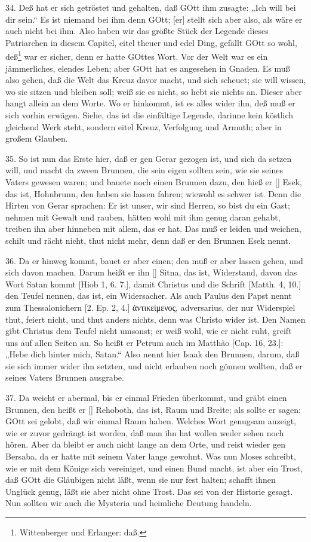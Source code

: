 34. Deß hat er sich getröstet und gehalten, daß GOtt ihm zusagte: „Ich will bei dir sein.“ Es ist niemand bei ihm denn GOtt; [er] stellt sich aber also, als wäre er auch nicht bei ihm. Also haben wir das größte Stück der Legende dieses Patriarchen in diesem Capitel, eitel theuer und edel Ding, gefällt GOtt so wohl, deß\footnote{Wittenberger und Erlanger: daß.} war er sicher, denn er hatte GOttes Wort. Vor der Welt war es ein jämmerliches, elendes Leben; aber GOtt hat es angesehen in Gnaden. Es muß also gehen, daß die Welt das Kreuz davor macht, und sich scheuet; sie will wissen, wo sie sitzen und bleiben soll; weiß sie es nicht, so hebt sie nichts an. Dieser aber hangt allein an dem Worte. Wo er hinkommt, ist es alles wider ihn, deß muß er sich vorhin erwägen. Siehe, das ist die einfältige Legende, darinne kein köstlich gleichend Werk steht, sondern eitel Kreuz, Verfolgung und Armuth; aber in großem Glauben.

35. So ist nun das Erste hier, daß er gen Gerar gezogen ist, und sich da setzen will, und macht da zween Brunnen, die sein eigen sollten sein, wie sie seines Vaters gewesen waren; und bauete noch einen Brunnen dazu, den hieß er [] Esek, das ist, Hohnbrunn, den haben sie lassen fahren; wiewohl es schwer ist. Denn die Hirten von Gerar sprachen: Er ist unser, wir sind Herren, so bist du ein Gast; nehmen mit Gewalt und rauben, hätten wohl mit ihm genug daran gehabt, treiben ihn aber hinneben mit allem, das er hat. Das muß er leiden und weichen, schilt und rächt nicht, thut nicht mehr, denn daß er den Brunnen Esek nennt.

36. Da er hinweg kommt, bauet er aber einen; den muß er aber lassen gehen, und sich davon machen. Darum heißt er ihn [] Sitna, das ist, Widerstand, davon das Wort Satan kommt [Hiob 1, 6. 7.], damit Christus und die Schrift [Matth. 4, 10.] den Teufel nennen, das ist, ein Widersacher. Als auch Paulus den Papst nennt zum Thessalonichern [2. Ep. 2, 4.] ἀντικείμενος, adversarius, der nur Widerspiel thut, feiert nicht, und thut anders nichts, denn was Christo wider ist. Den Namen gibt Christus dem Teufel nicht umsonst; er weiß wohl, wie er nicht ruht, greift uns auf allen Seiten an. So heißt er Petrum auch im Matthäo [Cap. 16, 23.]: „Hebe dich hinter mich, Satan.“ Also nennt hier Isaak den Brunnen, darum, daß sie sich immer wider ihn setzten, und nicht erlauben noch gönnen wollten, daß er seines Vaters Brunnen ausgrabe.

37. Da weicht er abermal, bis er einmal Frieden überkommt, und gräbt einen Brunnen, den heißt er [] Rehoboth, das ist, Raum und Breite; als sollte er sagen: GOtt sei gelobt, daß wir einmal Raum haben. Welches Wort genugsam anzeigt, wie er zuvor gedrängt ist worden, daß man ihn hat wollen weder sehen noch hören. Aber da bleibt er auch nicht lange an dem Orte, und reist wieder gen Bersaba, da er hatte mit seinem Vater lange gewohnt. Was nun Moses schreibt, wie er mit dem Könige sich vereiniget, und einen Bund macht, ist aber ein Trost, daß GOtt die Gläubigen nicht läßt, wenn sie nur fest halten; schafft ihnen Unglück genug, läßt sie aber nicht ohne Trost. Das sei von der Historie gesagt. Nun sollten wir auch die Mysteria und heimliche Deutung handeln.

